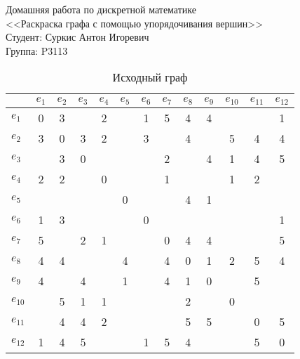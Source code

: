 \documentclass[a4paper,12pt]{article}
\begin{document}
\noindent Домашняя работа по дискретной математике \\
<<Раскраска графа с помощью упорядочивания вершин>> \\
Студент: Суркис Антон Игоревич \\
Группа: P3113
\pagestyle{fancy}
\fancyfoot{}

\begin{table}[H]
    \caption{Исходный граф}
    \begin{tabular}{|l|*{12}{c|}}
        \hline
                 & $e_1$ & $e_2$ & $e_3$ & $e_4$ & $e_5$ & $e_6$ & $e_7$ & $e_8$ & $e_9$ & $e_{10}$ & $e_{11}$ & $e_{12}$ \\ \hline
        $e_{ 1}$ &     0 &     3 &       &     2 &       &     1 &     5 &     4 &     4 &          &          &        1 \\ \hline
        $e_{ 2}$ &     3 &     0 &     3 &     2 &       &     3 &       &     4 &       &        5 &        4 &        4 \\ \hline
        $e_{ 3}$ &       &     3 &     0 &       &       &       &     2 &       &     4 &        1 &        4 &        5 \\ \hline
        $e_{ 4}$ &     2 &     2 &       &     0 &       &       &     1 &       &       &        1 &        2 &          \\ \hline
        $e_{ 5}$ &       &       &       &       &     0 &       &       &     4 &     1 &          &          &          \\ \hline
        $e_{ 6}$ &     1 &     3 &       &       &       &     0 &       &       &       &          &          &        1 \\ \hline
        $e_{ 7}$ &     5 &       &     2 &     1 &       &       &     0 &     4 &     4 &          &          &        5 \\ \hline
        $e_{ 8}$ &     4 &     4 &       &       &     4 &       &     4 &     0 &     1 &        2 &        5 &        4 \\ \hline
        $e_{ 9}$ &     4 &       &     4 &       &     1 &       &     4 &     1 &     0 &          &        5 &          \\ \hline
        $e_{10}$ &       &     5 &     1 &     1 &       &       &       &     2 &       &        0 &          &          \\ \hline
        $e_{11}$ &       &     4 &     4 &     2 &       &       &       &     5 &     5 &          &        0 &        5 \\ \hline
        $e_{12}$ &     1 &     4 &     5 &       &       &     1 &     5 &     4 &       &          &        5 &        0 \\ \hline
    \end{tabular}
\end{table}
\end{document}
